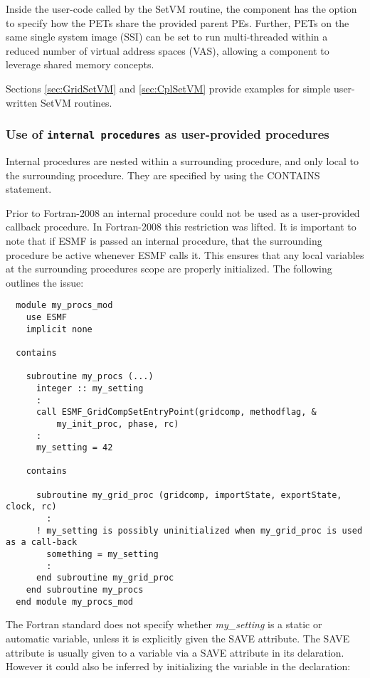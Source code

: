 Inside the user-code called by the SetVM routine, the component has the option to specify how the PETs share the provided parent PEs. Further, PETs on the same single system image (SSI) can be set to run multi-threaded within a reduced number of virtual address spaces (VAS), allowing a component to leverage shared memory concepts.

Sections \ref{sec:GridSetVM} and \ref{sec:CplSetVM} provide examples for
simple user-written SetVM routines.

\subsubsection{Use of {\tt internal procedures} as user-provided procedures}
\label{sec:AppDriverIntProc}

Internal procedures are nested within a surrounding procedure, and only local to the surrounding procedure.
They are specified by using the CONTAINS statement.

Prior to Fortran-2008 an internal procedure could not be used as a user-provided callback procedure.
In Fortran-2008 this restriction was lifted.  It is important to note that if ESMF is passed an internal
procedure, that the surrounding procedure be active whenever ESMF calls it.  This ensures that any
local variables at the surrounding procedures scope are properly initialized.  The following outlines
the issue:

\begin{verbatim}
  module my_procs_mod
    use ESMF
    implicit none

  contains

    subroutine my_procs (...)
      integer :: my_setting
      :
      call ESMF_GridCompSetEntryPoint(gridcomp, methodflag, &
          my_init_proc, phase, rc)
      :
      my_setting = 42

    contains

      subroutine my_grid_proc (gridcomp, importState, exportState, clock, rc)
        :
      ! my_setting is possibly uninitialized when my_grid_proc is used as a call-back
        something = my_setting
        :
      end subroutine my_grid_proc
    end subroutine my_procs
  end module my_procs_mod
\end{verbatim}

The Fortran standard does not specify whether {\it my\_setting} is a static or automatic
variable, unless it is explicitly given the SAVE attribute.  The SAVE attribute is usually
given to a variable via a SAVE attribute in its delaration.  However it could also be
inferred by initializing the variable in the declaration:

